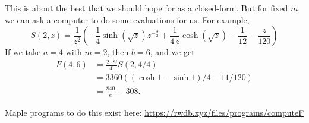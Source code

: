 \documentclass{rudin}
\begin{document}
This is about the best that we should hope for as a closed-form. But for fixed
$m$, we can ask a computer to do some evaluations for us. For example,
\begin{equation*}
    S(2, z) =
{\frac {1}{{z}^{2}} \left( -{\frac {1}{4}\sinh \left( \sqrt {z} \right) {z}^{-{\frac{3}{2}}}}+{\frac {1}{4\,z}\cosh \left( \sqrt {z}
 \right) }-{\frac{1}{12}}-{\frac {z}{120}} \right) }
\end{equation*}
If we take $a = 4$ with $m = 2$, then $b = 6$, and we get
\begin{align*}
    F(4, 6) &= \frac{2 \cdot 8!}{4!} S(2, 4 / 4) \\
            &= 3360 ((\cosh 1 - \sinh 1) / 4 - 11 / 120) \\
            &= \frac{840}{e} - 308.
\end{align*}

Maple programs to do this exist here: \url{https://rwdb.xyz/files/programs/computeF}
\end{document}

